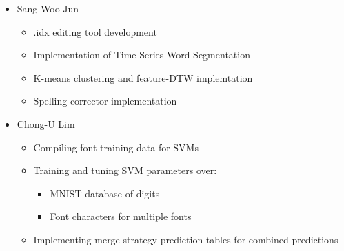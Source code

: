\documentclass[12pt]{article}
\begin{document}
	\begin{itemize}
		\item Sang Woo Jun
			\begin{itemize}
				\item .idx editing tool development
				\item Implementation of Time-Series Word-Segmentation
				\item K-means clustering and feature-DTW implemtation
				\item Spelling-corrector implementation
			\end{itemize}
			
		\item Chong-U Lim
			\begin{itemize}
				\item Compiling font training data for SVMs
				\item Training and tuning SVM parameters over:
					\begin{itemize}
						\item MNIST database of digits
						\item Font characters for multiple fonts
					\end{itemize}
				\item Implementing merge strategy prediction tables for combined predictions
			
			\end{itemize}
	\end{itemize}
	
	

\end{document}

